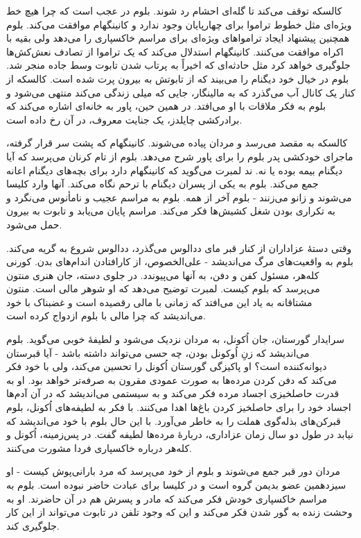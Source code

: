 \documentclass[12pt]{book}
\begin{document}
    کالسکه توقف می‌کند تا گله‌ای احشام رد شوند. بلوم در عجب است که چرا هیچ خط ویژه‌ای مثل خطوط تراموا برای چهارپایان وجود ندارد و کانینگهام موافقت می‌کند. بلوم همچنین پیشنهاد ایجاد ترامواهای ویژه‌ای برای مراسم خاکسپاری را می‌دهد ولی بقیه با اکراه موافقت می‌کنند. کانینگهام استدلال می‌کند که یک تراموا از تصادف نعش‌کش‌ها جلوگیری خواهد کرد مثل حادثه‌ای که اخیراً به پرتاب شدن تابوت وسط جاده منجر شد. بلوم در خیال خود دیگنام را می‌بیند که از تابوتش به بیرون پرت شده است. کالسکه از کنار یک کانال آب می‌گذرد که به مالینگار، جایی که میلی زندگی می‌کند منتهی می‌شود و بلوم به فکر ملاقات با او می‌افتد. در همین حین، پاور به خانه‌ای اشاره می‌کند که برادرکشی چایلدز، یک جنایت معروف، در آن رخ داده است.

    کالسکه به مقصد می‌رسد و مردان پیاده می‌شوند. کانینگهام که پشت سر قرار گرفته، ماجرای خودکشی پدر بلوم را برای پاور شرح می‌دهد. بلوم از تام کرنان می‌پرسد که آیا دیگنام بیمه بوده یا نه. ند لمبرت می‌گوید که کانینگهام دارد برای بچه‌های دیگنام اعانه جمع می‌کند. بلوم به یکی از پسران دیگنام با ترحم نگاه می‌کند. آنها وارد کلیسا می‌شوند و زانو می‌زنند - بلوم آخر از همه. بلوم به مراسم عجیب و نامأنوس می‌نگرد و به تکراری بودن شغل کشیش‌ها فکر می‌کند. مراسم پایان می‌یابد و تابوت به بیرون حمل می‌شود.

    وقتی دستۀ عزاداران از کنار قبر مای ددالوس می‌گذرد، ددالوس شروع به گریه می‌کند. بلوم به واقعیت‌های مرگ می‌اندیشد - علی‌الخصوص، از کارافتادن اندام‌های بدن. کورنی کله‌هر، مسئول کفن و دفن، به آنها می‌پیوندد. در جلوی دسته، جان هنری منتون می‌پرسد که بلوم کیست. لمبرت توضیح می‌دهد که او شوهر مالی است. منتون مشتاقانه به یاد این می‌افتد که زمانی با مالی رقصیده است و غضبناک با خود می‌اندیشد که چرا مالی با بلوم ازدواج کرده است.

    سرایدار گورستان، جان اُکونل، به مردان نزدیک می‌شود و لطیفۀ خوبی می‌گوید. بلوم می‌اندیشد که زنِ اُوکونل بودن، چه حسی می‌تواند داشته باشد - آیا قبرستان دیوانه‌کننده است؟ او پاکیزگی گورستان اُکونل را تحسین می‌کند، ولی با خود فکر می‌کند که دفن کردن مرده‌ها به صورت عمودی مقرون به صرفه‌تر خواهد بود. او به قدرت حاصلخیزی اجساد مرده فکر می‌کند و به سیستمی می‌اندیشد که در آن آدم‌ها اجساد خود را برای حاصلخیز کردن باغ‌ها اهدا می‌کنند. با فکر به لطیفه‌های اُکونل، بلوم قبرکن‌های بذله‌گوی هملت را به خاطر می‌آورد. با این حال بلوم با خود می‌اندیشد که نیابد در طول دو سال زمان عزاداری، دربارۀ مرده‌ها لطیفه گفت. در پس‌زمینه، اُکونل و کله‌هر درباره خاکسپاری فردا مشورت می‌کنند.

    مردان دور قبر جمع می‌شوند و بلوم از خود می‌پرسد که مرد بارانی‌پوش کیست - او سیزدهمین عضو بدیمن گروه است و در کلیسا برای عبادت حاضر نبوده است. بلوم به مراسم خاکسپاری خودش فکر می‌کند که مادر و پسرش هم در آن حاضرند. او به وحشت زنده به گور شدن فکر می‌کند و این که وجود تلفن در تابوت می‌تواند از این کار جلوگیری کند.
\end{document}
